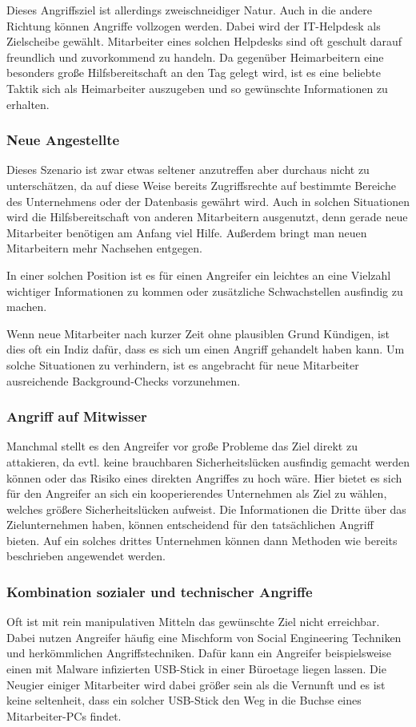Dieses Angriffsziel ist allerdings zweischneidiger Natur. Auch in die andere Richtung können Angriffe vollzogen werden. Dabei wird der IT-Helpdesk als Zielscheibe gewählt. Mitarbeiter eines solchen Helpdesks sind oft geschult darauf freundlich und zuvorkommend zu handeln. Da gegenüber Heimarbeitern eine besonders große Hilfsbereitschaft an den Tag gelegt wird, ist es eine beliebte Taktik sich als Heimarbeiter auszugeben und so gewünschte Informationen zu erhalten.

\subsubsection{Neue Angestellte}\label{neueangestellte}
Dieses Szenario ist zwar etwas seltener anzutreffen aber durchaus nicht zu unterschätzen, da auf diese Weise bereits Zugriffsrechte auf bestimmte Bereiche des Unternehmens oder der Datenbasis gewährt wird. Auch in solchen Situationen wird die Hilfsbereitschaft von anderen Mitarbeitern ausgenutzt, denn gerade neue Mitarbeiter benötigen am Anfang viel Hilfe. Außerdem bringt man neuen Mitarbeitern mehr Nachsehen entgegen.

In einer solchen Position ist es für einen Angreifer ein leichtes an eine Vielzahl wichtiger Informationen zu kommen oder zusätzliche Schwachstellen ausfindig zu machen.

Wenn neue Mitarbeiter nach kurzer Zeit ohne plausiblen Grund Kündigen, ist dies oft ein Indiz dafür, dass es sich um einen Angriff gehandelt haben kann. Um solche Situationen zu verhindern, ist es angebracht für neue Mitarbeiter ausreichende Background-Checks vorzunehmen.

\subsubsection{Angriff auf Mitwisser}\label{angriffaufmitwisser}
Manchmal stellt es den Angreifer vor große Probleme das Ziel direkt zu attakieren, da evtl. keine brauchbaren Sicherheitslücken ausfindig gemacht werden können oder das Risiko eines direkten Angriffes zu hoch wäre. Hier bietet es sich für den Angreifer an sich ein kooperierendes Unternehmen als Ziel zu wählen, welches größere Sicherheitslücken aufweist. Die Informationen die Dritte über das Zielunternehmen haben, können entscheidend für den tatsächlichen Angriff bieten. Auf ein solches drittes Unternehmen können dann Methoden wie bereits beschrieben angewendet werden.

\subsubsection{Kombination sozialer und technischer Angriffe}\label{kombination}
 Oft ist mit rein manipulativen Mitteln das gewünschte Ziel nicht erreichbar. Dabei nutzen Angreifer häufig eine Mischform von Social Engineering Techniken und herkömmlichen Angriffstechniken. Dafür kann ein Angreifer beispielsweise einen mit Malware infizierten USB-Stick in einer Büroetage liegen lassen. Die Neugier einiger Mitarbeiter wird dabei größer sein als die Vernunft und es ist keine seltenheit, dass ein solcher USB-Stick den Weg in die Buchse eines Mitarbeiter-PCs findet.

